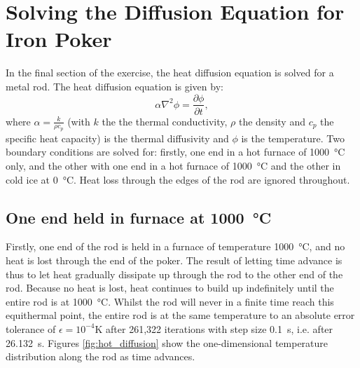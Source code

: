 \section{Solving the Diffusion Equation for Iron Poker}
\label{sec:diffusion_equation}

In the final section of the exercise, the heat diffusion equation is solved for a metal rod. The heat diffusion equation is given by:
\begin{equation}
    \alpha \nabla^2 \phi = \frac{\partial \phi}{\partial t},
\end{equation}
where $\alpha = \frac{k}{\rho c_p}$ (with $k$ the the thermal conductivity, $\rho$ the density and $c_p$ the specific heat capacity) is the thermal diffusivity and $\phi$ is the temperature. Two boundary conditions are solved for: firstly, one end in a hot furnace of \SI{1000}{\celsius} only, and the other with one end in a hot furnace of \SI{1000}{\celsius} and the other in cold ice at \SI{0}{\celsius}. Heat loss through the edges of the rod are ignored throughout.

\subsection{One end held in furnace at \SI{1000}{\celsius}}
\label{subsec:hot}

Firstly, one end of the rod is held in a furnace of temperature \SI{1000}{\celsius}, and no heat is lost through the end of the poker. The result of letting time advance is thus to let heat gradually dissipate up through the rod to the other end of the rod. Because no heat is lost, heat continues to build up indefinitely until the entire rod is at \SI{1000}{\celsius}. Whilst the rod will never in a finite time reach this equithermal point, the entire rod is at the same temperature to an absolute error tolerance of $\epsilon = 10^{-4}$\si{\kelvin} after 261,322 iterations with step size \SI{0.1}{\second}, i.e. after \SI{26,132}{\second}. Figures \ref{fig:hot_diffusion} show the one-dimensional temperature distribution along the rod as time advances.

